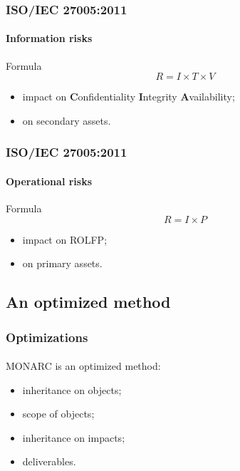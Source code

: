 \begin{frame}
    \frametitle{ISO/IEC 27005:2011}
    \framesubtitle{Information risks}
    \begin{block}{Formula}
        $$R = I \times T \times V$$
        \begin{itemize}
            \item impact on \textbf{C}onfidentiality \textbf{I}ntegrity \textbf{A}vailability;
            \item on secondary assets.
        \end{itemize}
    \end{block}
\end{frame}


\begin{frame}
    \frametitle{ISO/IEC 27005:2011}
    \framesubtitle{Operational risks}
    \begin{block}{Formula}
        $$R = I \times P$$
        \begin{itemize}
            \item impact on ROLFP;
            \item on primary assets.
        \end{itemize}
    \end{block}
\end{frame}


\subsection{An optimized method}
\begin{frame}
    \frametitle{Optimizations}
    \framesubtitle{}
    MONARC is an optimized method:
    \begin{itemize}
        \item inheritance on objects;
        \item scope of objects;
        \item inheritance on impacts;
        \item deliverables.
    \end{itemize}
\end{frame}

